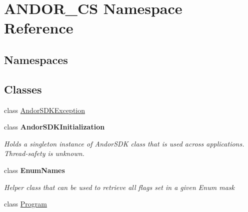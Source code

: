 \hypertarget{namespace_a_n_d_o_r___c_s}{}\section{A\+N\+D\+O\+R\+\_\+\+CS Namespace Reference}
\label{namespace_a_n_d_o_r___c_s}
\subsection*{Namespaces}
\begin{DoxyCompactItemize}
\end{DoxyCompactItemize}
\subsection*{Classes}
\begin{DoxyCompactItemize}
\item 
class \hyperlink{class_a_n_d_o_r___c_s_1_1_andor_s_d_k_exception}{Andor\+S\+D\+K\+Exception}
\item 
class {\bfseries Andor\+S\+D\+K\+Initialization}
\begin{DoxyCompactList}\small\item\em Holds a singleton instance of Andor\+S\+DK class that is used across applications. Thread-\/safety is unknown. \end{DoxyCompactList}\item 
class {\bfseries Enum\+Names}
\begin{DoxyCompactList}\small\item\em Helper class that can be used to retrieve all flags set in a given Enum mask \end{DoxyCompactList}\item 
class \hyperlink{class_a_n_d_o_r___c_s_1_1_program}{Program}
\end{DoxyCompactItemize}

